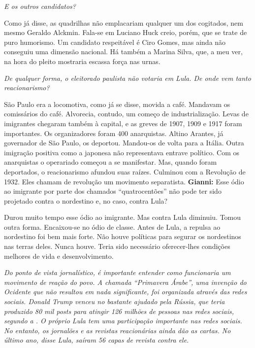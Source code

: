\itshape
 E os outros candidatos?

\normalfont 
Como já disse, as quadrilhas não emplacariam qualquer um
dos cogitados, nem mesmo Geraldo Alckmin. Fala-se em Luciano Huck creio,
porém, que se trate de puro humorismo. Um candidato respeitável é Ciro
Gomes, mas ainda não conseguiu uma dimensão nacional. Há também a Marina
Silva, que, a meu ver, na hora do pleito mostraria escassa força nas
urnas.

\itshape
 De qualquer forma, o eleitorado paulista não votaria em
Lula. De onde vem tanto reacionarismo?

\normalfont 
São Paulo era a locomotiva, como já se disse, movida a
café. Mandavam os comissários do café. Alvorecia, contudo, um começo de
industrialização. Levas de imigrantes chegaram também à capital, e as
greves de 1907, 1909 e 1917 foram importantes. Os organizadores foram
400 anarquistas. Altino Arantes, já governador de São Paulo, os
deportou. Mandou-os de volta para a Itália. Outra imigração positiva
como a japonesa não representava entrave político. Com os anarquistas o
operariado começou a se manifestar. Mas, quando foram deportados, o
reacionarismo afundou suas raízes. Culminou com a Revolução de 1932.
Eles chamam de revolução um movimento separatista. \textbf{Gianni:} Esse
ódio ao imigrante por parte dos chamados ``quatrocentões'' não pode ter
sido projetado contra o nordestino e, no caso, contra Lula?

\normalfont 
Durou muito tempo esse ódio ao imigrante. Mas contra Lula
diminuiu. Tomou outra forma. Encaixou-se no ódio de classe. Antes de
Lula, a repulsa ao nordestino foi bem mais forte. Não houve políticas
para segurar os nordestinos nas terras deles. Nunca houve. Teria sido
necessário oferecer-lhes condições melhores de vida e desenvolvimento.

\itshape
 Do ponto de vista jornalístico, é importante entender
como funcionaria um movimento de reação do povo. A chamada ``Primavera
Árabe'', uma invenção do Ocidente que não resultou em nada significante,
foi organizada através das redes sociais. Donald Trump venceu no 
bastante ajudado pela Rússia, que teria produzido 80 mil \emph{posts}
para atingir 126 milhões de pessoas nas redes sociais, segundo a . O
próprio Lula tem uma participação importante nas redes sociais. No
entanto, os jornalões e as revistas reacionárias ainda dão as cartas. No
último ano, disse Lula, saíram 56 capas de revista contra ele.

